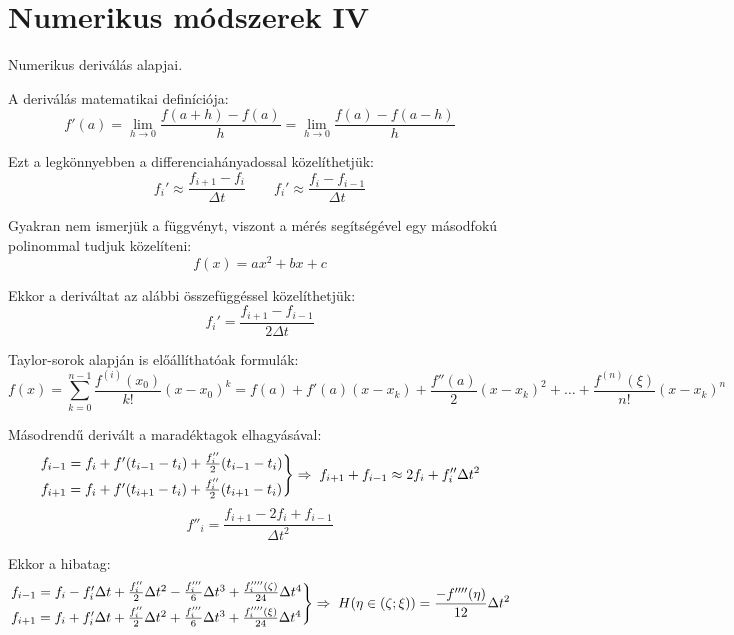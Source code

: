 \documentclass[../../main.tex]{subfiles}
\begin{document}
\section{Numerikus módszerek IV}

\begin{fulltheorem}
  Numerikus deriválás alapjai.
\end{fulltheorem}

A deriválás matematikai definíciója:
\[
  f'(a)
  = \lim_{h \rightarrow 0} \frac{f(a + h) - f(a)}{h}
  = \lim_{h \rightarrow 0} \frac{f(a) - f(a - h)}{h}
\]

Ezt a legkönnyebben a differenciahányadossal közelíthetjük:
\[
  f_i' \approx \frac{f_{i + 1} - f_i}{\Delta t}
  \qquad
  f_i' \approx \frac{f_i - f_{i - 1}}{\Delta t}
\]

Gyakran nem ismerjük a függvényt, viszont a mérés segítségével egy másodfokú
polinommal tudjuk közelíteni:
\[
  f(x) = ax^2 + bx + c
\]

Ekkor a deriváltat az alábbi összefüggéssel közelíthetjük:
\[
  f_i' = \frac{f_{i+1} - f_{i-1}}{2 \Delta t}
\]

Taylor-sorok alapján is előállíthatóak formulák:
\[
  f(x)
  = \sum_{k=0}^{n - 1} \frac{f^{(i)}(x_0)}{k!} (x - x_0)^k
  = f(a)
  + f'(a) (x - x_k)
  + \frac{f''(a)}{2} (x - x_k)^2
  + \ldots
  + \frac{f^{(n)}(\xi)}{n!} (x - x_k)^n
\]

Másodrendű derivált a maradéktagok elhagyásával:
\[
  \begin{rcases}
    f_{i-1} = f_i + f'(t_{i-1} - t_{i}) + \frac{f''_i}{2}(t_{i-1} - t_i) \\
    f_{i+1} = f_i + f'(t_{i+1} - t_{i}) + \frac{f''_i}{2}(t_{i+1} - t_i)
  \end{rcases} \Rightarrow \;
  f_{i+1} + f_{i-1} \approx 2 f_i + f''_i \Delta t^2
\]\[
  f''_i = \frac{f_{i+1} - 2 f_{i} + f_{i-1}}{\Delta t^2}
\]

Ekkor a hibatag:
\[
  \begin{rcases}
    f_{i-1}
    = f_i
    - f_i' \Delta t
    + \frac{f_i''}{2} \Delta t^2
    - \frac{f_i'''}{6} \Delta t^3
    + \frac{f_i''''(\zeta)}{24} \Delta t^4
    \\
    f_{i+1}
    = f_i
    + f_i' \Delta t
    + \frac{f_i''}{2} \Delta t^2
    + \frac{f_i'''}{6} \Delta t^3
    + \frac{f_i''''(\xi)}{24} \Delta t^4
  \end{rcases} \Rightarrow \;
  H(\eta \in (\zeta ; \xi)) = \frac{-f''''(\eta)}{12} \Delta t^2
\]
\end{document}
